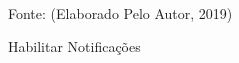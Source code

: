 \begin{figure}[!htpb]
	\centering
	\caption{Habilitar Notificações}
	\\
	Fonte: (Elaborado Pelo Autor, 2019)
	\label{notificacao}
\end{figure}

